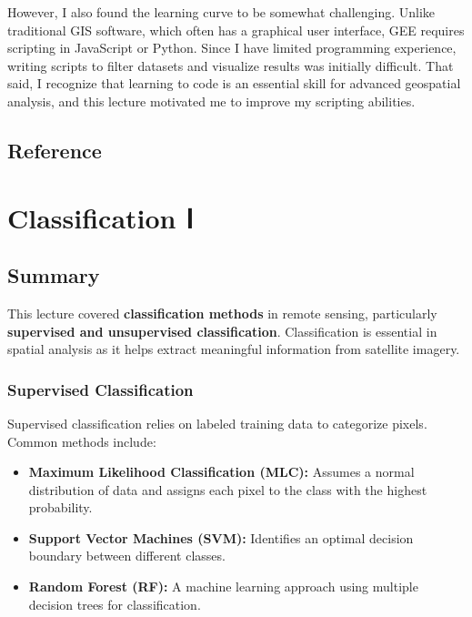 \documentclass[
  letterpaper,
]{scrbook}
\begin{document}
However, I also found the learning curve to be somewhat challenging.
Unlike traditional GIS software, which often has a graphical user
interface, GEE requires scripting in JavaScript or Python. Since I have
limited programming experience, writing scripts to filter datasets and
visualize results was initially difficult. That said, I recognize that
learning to code is an essential skill for advanced geospatial analysis,
and this lecture motivated me to improve my scripting abilities.

\section{Reference}\label{reference-3}


\chapter{Classification Ⅰ}\label{classification-ux2170}

\section{Summary}\label{summary-3}

This lecture covered \textbf{classification methods} in remote sensing,
particularly \textbf{supervised and unsupervised classification}.
Classification is essential in spatial analysis as it helps extract
meaningful information from satellite imagery.

\subsection{\texorpdfstring{\textbf{Supervised
Classification}}{Supervised Classification}}\label{supervised-classification}

Supervised classification relies on labeled training data to categorize
pixels. Common methods include:

\begin{itemize}
\item
  \textbf{Maximum Likelihood Classification (MLC):} Assumes a normal
  distribution of data and assigns each pixel to the class with the
  highest probability.
\item
  \textbf{Support Vector Machines (SVM):} Identifies an optimal decision
  boundary between different classes.
\item
  \textbf{Random Forest (RF):} A machine learning approach using
  multiple decision trees for classification.
\end{itemize}
\end{document}
